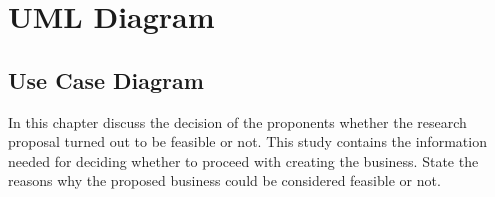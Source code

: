 \chapter{UML Diagram}\label{intro}

\section{Use Case Diagram}
In this chapter discuss the decision of the proponents whether the research proposal turned out to be feasible or not. This study contains the information needed for deciding whether to proceed with creating the business. State the reasons why the proposed business could be considered feasible or not.